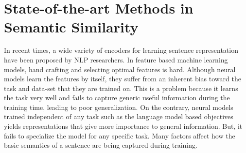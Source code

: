\documentclass[12pt]{report} %
\begin{document}
%
%
%
% 


\chapter{State-of-the-art Methods in Semantic Similarity }
\label{proposed_work}

In recent times, a wide variety of encoders for learning sentence representation have been proposed by NLP researchers. 
In feature based machine learning models, hand crafting and selecting optimal features is hard. Although neural models learn the features by itself, they suffer from an inherent bias toward the task and data-set that they are trained on.
This is a problem because it learns the task very well and fails to capture generic useful information during the training time, leading to poor generalization. On the contrary, neural models trained independent of any task such as the language model based objectives yields representations that give more importance to general information. But, it fails to specialize the model for any specific task. Many factors affect how the basic semantics of a sentence are being captured during training. 
\end{document}
